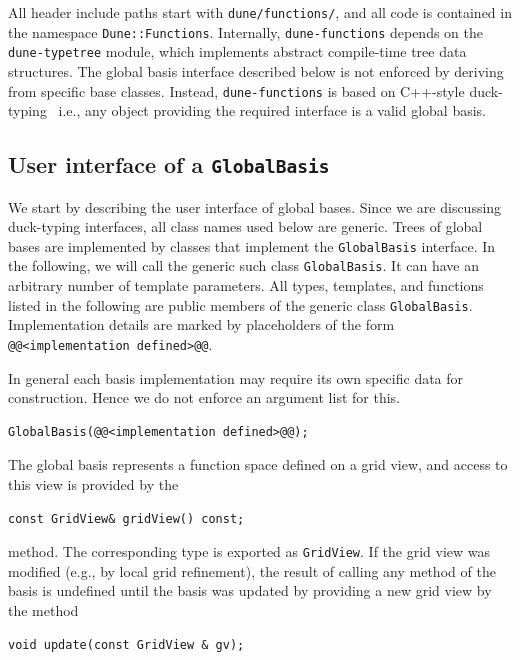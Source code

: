 \documentclass[a4paper,10pt,headings=normal,bibliography=totoc]{scrartcl}
\newcommand{\cpp}[1]{\lstinline[basicstyle=\ttfamily]!#1!}
\newcommand{\dunemodule}[1]{\texttt{#1}}
\begin{document}
All header include paths
start with \cpp{dune/functions/}, and all code is contained in the namespace \cpp{Dune::Functions}.
Internally, \dunemodule{dune-functions} depends on the \dunemodule{dune-typetree} module,
which implements abstract compile-time tree data structures.
The global basis interface described below is not enforced by deriving
from specific base classes. Instead, \dunemodule{dune-functions} is based on
C++-style duck-typing~\cite{koenig_moo:2005}
i.e., any object providing the required
interface is a valid global basis.



\subsection{User interface of a \texorpdfstring{\cpp{GlobalBasis}}{GlobalBasis}}
We start by describing the user interface of global bases.  Since we are discussing duck-typing interfaces,
all class names used below are generic. Trees of global bases are implemented by classes that implement
the \cpp{GlobalBasis} interface. In the following, we will call the generic such class \cpp{GlobalBasis}.
It can have an arbitrary number of template parameters.
All types, templates, and functions listed in the following are public members of
the generic class \cpp{GlobalBasis}. Implementation details are marked
by placeholders of the form \cpp{@@<implementation defined>@@}.

In general each basis implementation may require its own specific data for construction.
Hence we do not enforce an argument list for this.
\begin{lstlisting}[style=Interface]
GlobalBasis(@@<implementation defined>@@);
\end{lstlisting}
The global basis represents a function space defined on a grid view, and access to
this view is provided by the
\begin{lstlisting}[style=Interface]
const GridView& gridView() const;
\end{lstlisting}
method. The corresponding type
is exported as \cpp{GridView}. If the grid view
was modified (e.g., by local grid refinement), the result of calling any
method of the basis is undefined until the basis was updated by
providing a new grid view by the method
\begin{lstlisting}[style=Interface]
void update(const GridView & gv);
\end{lstlisting}
\end{document}
